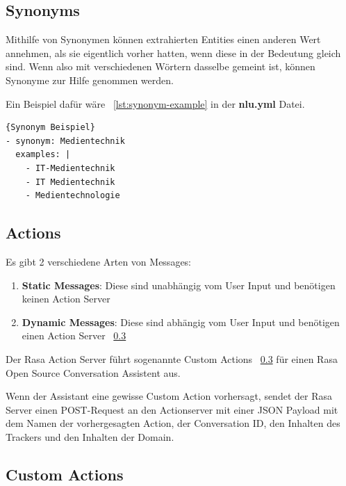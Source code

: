 \subsection{Synonyms}\label{subsection:synonyms}

Mithilfe von Synonymen können extrahierten Entities einen anderen Wert annehmen, als sie eigentlich vorher hatten, wenn diese in der Bedeutung gleich sind.
Wenn also mit verschiedenen Wörtern dasselbe gemeint ist, können Synonyme zur Hilfe genommen werden.\cite{synonyms}

Ein Beispiel dafür wäre ~\ref{lst:synonym-example} in der \textbf{nlu.yml} Datei.

\begin{lstlisting}[label={lst:synonym-example},caption={Synonym Beispiel}]{Synonym Beispiel}
- synonym: Medientechnik
  examples: |
    - IT-Medientechnik
    - IT Medientechnik
    - Medientechnologie
\end{lstlisting}

\subsection{Actions}\label{subsec:actions}

Es gibt 2 verschiedene Arten von Messages:

\begin{enumerate}
    \item \textbf{Static Messages}: Diese sind unabhängig vom User Input und benötigen keinen Action Server\cite{actionsVid}
    \item \textbf{Dynamic Messages}: Diese sind abhängig vom User Input und benötigen einen Action Server ~\ref{subsec:custom-actions}\cite{actionsVid}
\end{enumerate}

Der Rasa Action Server führt sogenannte Custom Actions ~\ref{subsec:custom-actions} für einen Rasa Open Source Conversation Assistent aus.

Wenn der Assistant eine gewisse Custom Action vorhersagt, sendet der Rasa Server einen POST-Request an den Actionserver mit einer JSON Payload mit dem Namen der vorhergesagten Action, der Conversation ID, den Inhalten des Trackers und den Inhalten der Domain.\cite{actions}

\subsection{Custom Actions}\label{subsec:custom-actions}

